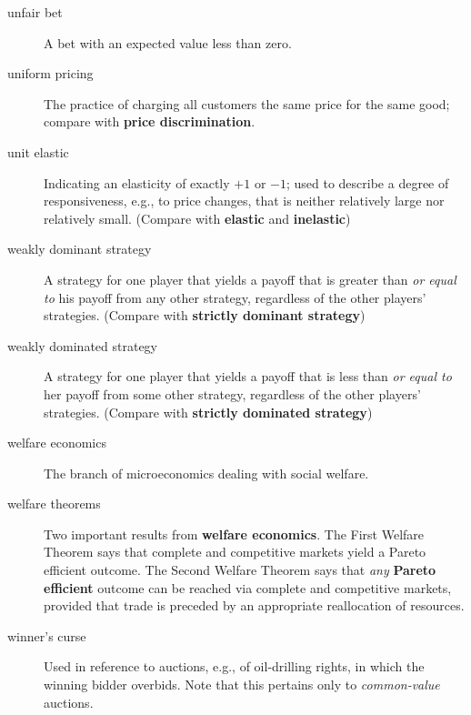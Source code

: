 \begin{description}
\item[unfair bet] A bet with an expected value less than zero.

\item[uniform pricing] The practice of charging all customers the same price for the same good; compare with \textbf{price discrimination}. 

\item[unit elastic] Indicating an elasticity of exactly $+1$ or $-1$; used to describe a degree of responsiveness, e.g., to price changes, that is neither relatively large nor relatively small. (Compare with \textbf{elastic} and \textbf{inelastic})

\item[weakly dominant strategy] A strategy for one player that yields a payoff that is greater than \emph{or equal to} his payoff from any other strategy, regardless of the other players' strategies. (Compare with \textbf{strictly dominant strategy})

\item[weakly dominated strategy] A strategy for one player that yields a payoff that is less than \emph{or equal to} her payoff from some other strategy, regardless of the other players' strategies. (Compare with \textbf{strictly dominated strategy})

\item[welfare economics] The branch of microeconomics dealing with social welfare.

\item[welfare theorems] Two important results from \textbf{welfare economics}. The First Welfare Theorem says that complete and competitive markets yield a Pareto efficient outcome. The Second Welfare Theorem says that \emph{any} \textbf{Pareto efficient} outcome can be reached via complete and competitive markets, provided that trade is preceded by an appropriate reallocation of resources.

\item[winner's curse] Used in reference to auctions, e.g., of oil-drilling rights, in which the winning bidder overbids. Note that this pertains only to \emph{common-value} auctions.
\end{description}

\begin{comment}
fixed cost
marginal cost
price theory
law of large numbers
indifference curve
certainty equivalent wealth
full insurance
interest rate
purchasing power
budget constraint
compound interest
bang-bang solution
liquidity
risk
equity premium puzzle
market
mechanism design
Coase Theorem
absolute advantage
comparative advantage
refinement
mixed strategy/MSNE
inverse demand curve
principal agent problem
collusion
Cournot
Stackleberg
best response function
first mover advantage
total revenue
total expenditure
tax equivalence
tvc
gains from trade
Chapter 3derive
\end{comment}
